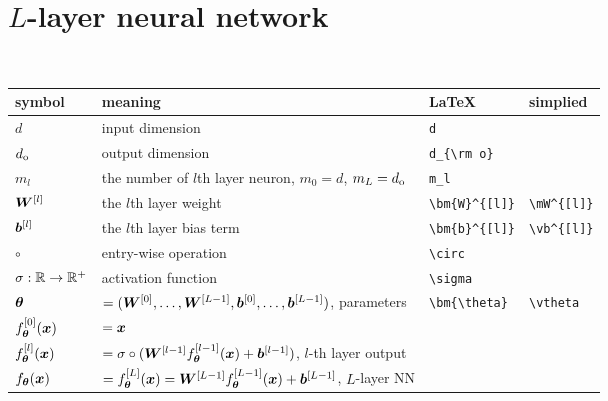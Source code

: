 \documentclass{article}
\begin{document}
\section{$L$-layer neural network}~\\
\begin{center}
    \begin{tabular}{llll}
        \toprule
        symbol                   & meaning                                                                                     & \LaTeX                  & simplied                \\
        \midrule
        $d$                      & input dimension                                                                             & \verb!d! &                         \\
        $d_{\rm o}$              & output dimension                                                                            & \verb!d_{\rm o}! &                         \\
        $m_l$                    & the number of $l$th layer neuron, $m_0=d$, $m_{L} = d_{\rm o}$                              & \verb!m_l!                           \\
        $\bm{W}^{[l]}$              & the $l$th layer weight                                                                      & \verb!\bm{W}^{[l]}! & \verb!\mW^{[l]}! \\
        $\bm{b}^{[l]}$              & the $l$th layer bias term                                                                   & \verb!\bm{b}^{[l]}! & \verb!\vb^{[l]}! \\
        $\circ$                  & entry-wise operation                                                                        & \verb!\circ!                           \\
        $\sigma:\mathbb{R}\to\mathbb{R}^+$     & activation function                                                                         & \verb!\sigma!                           \\
        $\bm{\theta}$                & $=(\bm{W}^{[0]},\ldots,\bm{W}^{[L-1]},\bm{b}^{[0]},\ldots,\bm{b}^{[L-1]})$,  parameters                 & \verb!\bm{\theta}! & \verb!\vtheta! \\
        $f_{\bm{\theta}}^{[0]}(\bm{x})$ & $=\bm{x}$                                                                                                                                          \\
        $f_{\bm{\theta}}^{[l]}(\bm{x})$ & $=\sigma\circ(\bm{W}^{[l-1]} f_{\bm{\theta}}^{[l-1]}(\bm{x}) + \bm{b}^{[l-1]})$,  $l$-th  layer output                                                       \\
        $f_{\bm{\theta}}(\bm{x})$       & $=f_{\bm{\theta}}^{[L]}(\bm{x})=\bm{W}^{[L-1]} f_{\bm{\theta}}^{[L-1]}(\bm{x}) + \bm{b}^{[L-1]}$,  $L$-layer NN                                                     \\
        \bottomrule
    \end{tabular}
\end{center}
\end{document}
